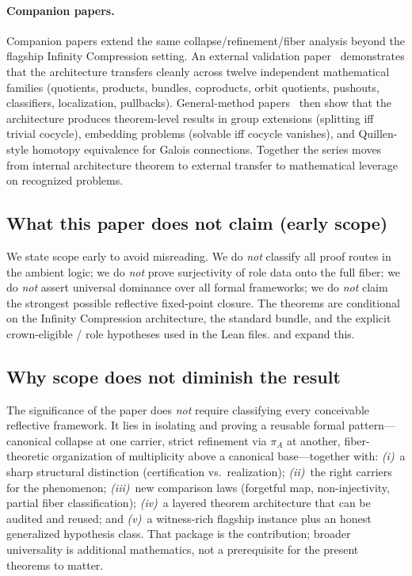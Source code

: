 \documentclass[11pt]{article}
\begin{document}
\paragraph{Companion papers.}
Companion papers extend the same collapse/refinement/fiber analysis beyond the flagship Infinity Compression setting. An external validation paper~\cite{SpivackValidation} demonstrates that the architecture transfers cleanly across twelve independent mathematical families (quotients, products, bundles, coproducts, orbit quotients, pushouts, classifiers, localization, pullbacks). General-method papers~\cite{SpivackFiber,SpivackQuillen} then show that the architecture produces theorem-level results in group extensions (splitting iff trivial cocycle), embedding problems (solvable iff cocycle vanishes), and Quillen-style homotopy equivalence for Galois connections. Together the series moves from internal architecture theorem to external transfer to mathematical leverage on recognized problems.

\subsection{What this paper does not claim (early scope)}\label{sec:intro-not-claimed}
We state scope early to avoid misreading. We do \emph{not} classify all proof routes in the ambient logic; we do \emph{not} prove surjectivity of role data onto the full fiber; we do \emph{not} assert universal dominance over all formal frameworks; we do \emph{not} claim the strongest possible reflective fixed-point closure. The theorems are conditional on the Infinity Compression architecture, the standard bundle, and the explicit crown-eligible / role hypotheses used in the Lean files.  and  expand this.

\subsection{Why scope does not diminish the result}\label{sec:intro-scope-value}
\begin{sloppypar}
The significance of the paper does \emph{not} require classifying every conceivable reflective framework. It lies in isolating and proving a reusable formal pattern---canonical collapse at one carrier, strict refinement via $\pi_A$ at another, fiber-theoretic organization of multiplicity above a canonical base---together with: \emph{(i)}~a sharp structural distinction (certification vs.\ realization); \emph{(ii)}~the right carriers for the phenomenon; \emph{(iii)}~new comparison laws (forgetful map, non-injectivity, partial fiber classification); \emph{(iv)}~a layered theorem architecture that can be audited and reused; and \emph{(v)}~a witness-rich flagship instance plus an honest generalized hypothesis class. That package is the contribution; broader universality is additional mathematics, not a prerequisite for the present theorems to matter.
\end{sloppypar}
\end{document}

